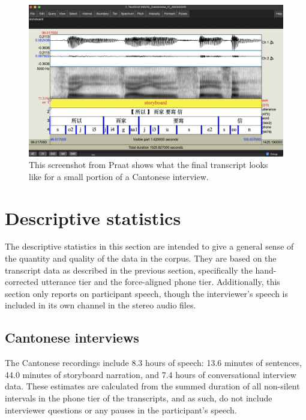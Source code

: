 \begin{figure}[htbp]
  \begin{center}
  \includegraphics[width=\textwidth]{figures/ch2_praat_transcript.png} 
  \caption{This screenshot from Praat shows what the final transcript looks like for a small portion of a Cantonese interview.}
  \label{ch2:fig:praat}
  \end{center}
\end{figure}


\section{Descriptive statistics}\label{ch2:sec:statistics}

The descriptive statistics in this section are intended to give a general sense of the quantity and quality of the data in the corpus. They are based on the transcript data as described in the previous section, specifically the hand-corrected utterance tier and the force-aligned phone tier. Additionally, this section only reports on participant speech, though the interviewer's speech is included in its own channel in the stereo audio files.

\subsection{Cantonese interviews}\label{ch2:subsec:cantonese_descriptive}

The Cantonese recordings include 8.3 hours of speech: 13.6 minutes of sentences, 44.0 minutes of storyboard narration, and 7.4 hours of conversational interview data. These estimates are calculated from the summed duration of all non-silent intervals in the phone tier of the transcripts, and as such, do not include interviewer questions or any pauses in the participant's speech. 


